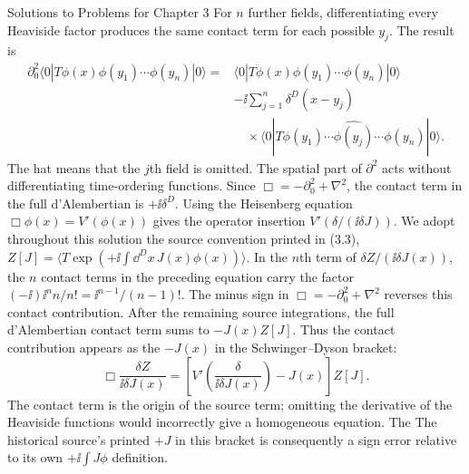 \begin{bankssolutions}{Solutions to Problems for Chapter 3}
For $n$ further fields, differentiating every Heaviside factor produces the
same contact term for each possible $y_j$.  The result is
\begin{align*}
 \partial_0^2\langle0|T\phi(x)\phi(y_1)\cdots\phi(y_n)|0\rangle
={}&\langle0|T\ddot\phi(x)\phi(y_1)\cdots\phi(y_n)|0\rangle\\
 &-\ii\sum_{j=1}^n\delta^D(x-y_j)
 \\[-2pt]
 &\quad{}\times\langle0|T\phi(y_1)\cdots\widehat{\phi(y_j)}\cdots\phi(y_n)|0\rangle.
\end{align*}
The hat means that the $j$th field is omitted.  The spatial part of $\partial^2$
acts without differentiating time-ordering functions.  Since
$\Box=-\partial_0^2+\nabla^2$, the contact term in the full d'Alembertian is
$+\ii\delta^D$.  Using the Heisenberg equation $\Box\phi(x)=V'(\phi(x))$
gives the operator insertion $V'(\delta/(\ii\delta J))$.  We adopt throughout this solution the source
convention printed in (3.3),
$Z[J]=\langle T\exp(+\ii\int\dd^D x\,J(x)\phi(x))\rangle$.  In the $n$th term of
$\delta Z/(\ii\delta J(x))$, the $n$ contact terms in the preceding
equation carry the factor
$(-\ii)\ii^n n/n!=\ii^{n-1}/(n-1)!$.  The minus sign in
$\Box=-\partial_0^2+\nabla^2$ reverses this contact contribution.  After the remaining
source integrations, the full d'Alembertian contact term sums to $-J(x)Z[J]$.
Thus the contact contribution appears as the $-J(x)$ in the
Schwinger--Dyson bracket:
\begin{equation*}
 \Box\frac{\delta Z}{\ii\delta J(x)}
 =\left[V'\!\left(\frac{\delta}{\ii\delta J(x)}\right)-J(x)\right]Z[J].
\end{equation*}
The contact term is the origin of the source term; omitting the derivative of
the Heaviside functions would incorrectly give a homogeneous equation.  The
The historical source's printed $+J$ in this bracket is consequently a sign error relative to
its own $+\ii\int J\phi$ definition.


\end{bankssolutions}

